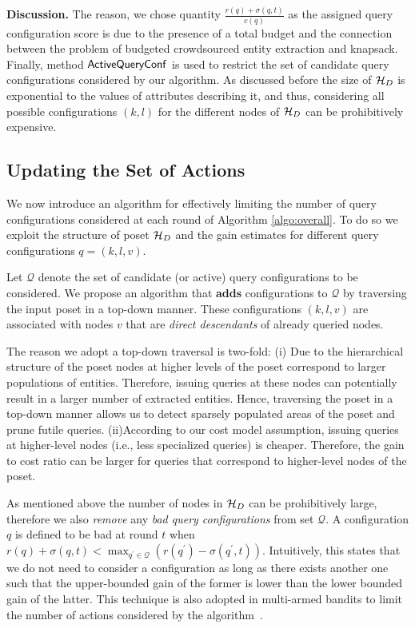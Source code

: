 \vspace{2pt}\noindent\textbf{Discussion.} The reason, we chose quantity $\frac{r(q) + \sigma(q,t)}{c(q)}$ as the assigned query configuration score is due to the presence of a total budget and the connection between the problem of budgeted crowdsourced entity extraction and knapsack. Finally, method ${\sf ActiveQueryConf}$ is used to restrict the set of candidate query configurations considered by our algorithm. As discussed before the size of $\mathcal{H}_D$ is exponential to the values of attributes describing it, and thus, considering all possible configurations $(k,l)$ for the different nodes of $\mathcal{H}_D$ can be prohibitively expensive. 

\subsection{Updating the Set of Actions}
\label{sec:badactions}
We now introduce an algorithm for effectively limiting the number of query configurations considered at each round of Algorithm \ref{algo:overall}. To do so we exploit the structure of poset $\mathcal{H}_D$ and the gain estimates for different query configurations $q = (k,l,v)$.

Let $\mathcal{Q}$ denote the set of candidate (or active) query configurations to be considered. We propose an algorithm that {\bf adds} configurations to $\mathcal{Q}$ by traversing the input poset in a top-down manner. These configurations $(k,l,v)$ are associated with nodes $v$ that are {\em direct descendants} of already queried nodes. 

The reason we adopt a top-down traversal is two-fold: (i) Due to the hierarchical structure of the poset nodes at higher levels of the poset correspond to larger populations of entities. Therefore, issuing queries at these nodes can potentially result in a larger number of extracted entities. Hence, traversing the poset in a top-down manner allows us to detect sparsely populated areas of the poset and prune futile queries. (ii)According to our cost model assumption, issuing queries at higher-level nodes (i.e., less specialized queries) is cheaper. Therefore, the gain to cost ratio can be larger for queries that correspond to higher-level nodes of the poset.

As mentioned above the number of nodes in $\mathcal{H}_D$ can be prohibitively large, therefore we also {\em remove} any {\em bad query configurations} from set $\mathcal{Q}$. A configuration $q$ is defined to be bad at round $t$ when $r(q) + \sigma(q,t) < \max_{q^{\prime} \in \mathcal{Q}} (r(q^{\prime}) - \sigma(q^{\prime},t))$. Intuitively, this states that we do not need to consider a configuration as long as there exists another one such that the upper-bounded gain of the former is lower than the lower bounded gain of the latter. This technique is also adopted in multi-armed bandits to limit the number of actions considered by the algorithm~\cite{EvenDar06actionelimination}. 

